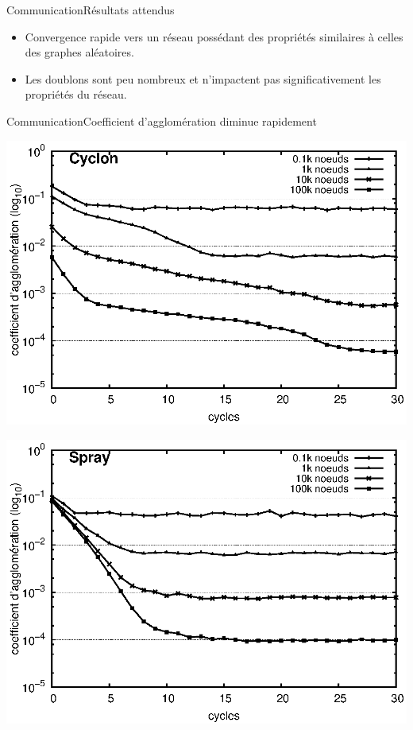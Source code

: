 \begin{frame}{Communication}{Résultats attendus}
  
  \begin{itemize}
  \item Convergence rapide vers un réseau possédant des propriétés similaires à
    celles des graphes aléatoires.
  \item Les doublons sont peu nombreux et n'impactent pas significativement les
    propriétés du réseau.
  \end{itemize}

\end{frame}

\begin{frame}{Communication}{Coefficient d'agglomération diminue rapidement}
  \hspace{-1cm}
  \begin{minipage}{0.47\textwidth}
    \begin{center}
      \includegraphics[width=1.23\textwidth]{img/network/cycloncluster.eps}
    \end{center}
  \end{minipage}
  \hfill
  \begin{minipage}{0.47\textwidth}
      \includegraphics[width=1.23\textwidth]{img/network/spraycluster.eps}
  \end{minipage}
\end{frame}



